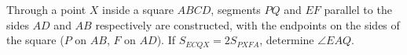 \problem
Through a point $X$ inside a square $ABCD$, segments $PQ$ and $EF$ parallel to
the sides $AD$ and $AB$ respectively are constructed, with the endpoints on the
sides of the square ($P$ on $AB$, $F$ on $AD$).
If $S_{ECQX} = 2 S_{PXFA}$, determine $\angle EAQ$.
\solution
\endproblem
